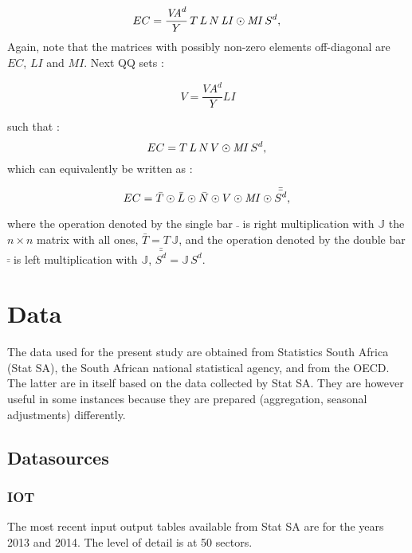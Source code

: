 \documentclass[12pt,english]{article}
\newcommand{\mli}[1]{\mathit{#1}}
\begin{document}
\begin{equation}
EC	= \frac{\mli{VA}^d}{Y} \, T \, L \, N \, \mli{LI} \odot \mli{MI} \, S^d,   \label{decompEC1} \\ 
\end{equation}
Again, note that the matrices with possibly non-zero elements off-diagonal are $EC$, $LI$ and $MI$. Next QQ sets :

$$ V = \frac{\mli{VA}^d}{Y} \mli{LI}$$ 

such that :
\begin{equation}
EC	= T \, L \, N \, V \odot \mli{MI} \, S^d,   \label{decompEC1} \\ 
\end{equation}
which can equivalently be written as :

\begin{equation}
EC	= \bar{T} \odot \bar{L} \odot \bar{N} \odot V \odot \mli{MI} \odot \bar{\bar{S^d}},   \label{decompEC2} \\ 
\end{equation}

where the operation denoted by the single bar $\bar{\ }$ is right multiplication with $\mathbb{J}$ the $n\times n$ matrix with all ones, $\bar{T} = T \, \mathbb{J}$, and the operation denoted by the double bar $\bar{\bar{\ }}$ is left multiplication with $\mathbb{J}$, $\bar{\bar{S^d}} = \mathbb{J} \, S^d$. 

\section{Data}

The data used for the present study are obtained from Statistics South Africa (Stat SA), the South African national statistical agency, and from the OECD. The latter are in itself based on the data collected by Stat SA. They are however useful in some instances because they are prepared (aggregation, seasonal adjustments) differently. 

\subsection{Datasources}

\subsubsection{IOT}	

The most recent input output tables available from Stat SA are for the years 2013 and 2014. The level of detail is at 50 sectors. 
\end{document}
